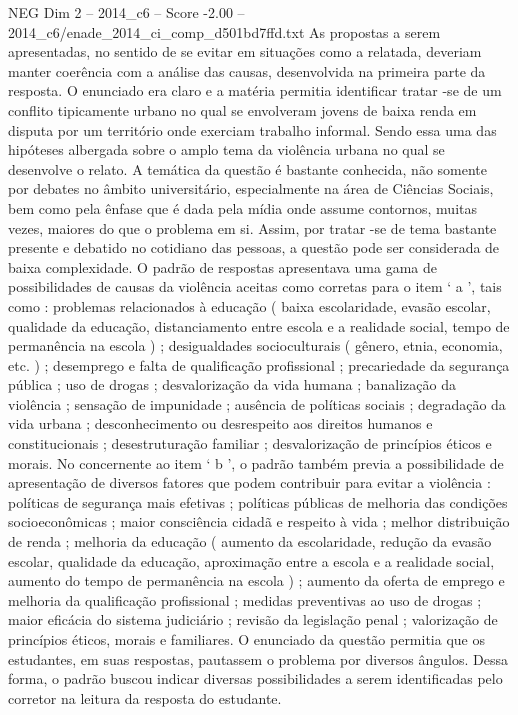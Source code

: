 \begin{textsample}{NEG Dim 2 – 2014\_c6 – Score -2.00 – 2014\_c6/enade\_2014\_ci\_comp\_d501bd7ffd.txt}
As propostas a serem apresentadas, no sentido de se evitar em situações como a relatada, deveriam manter coerência com a análise das causas, desenvolvida na primeira parte da resposta.
O enunciado era claro e a matéria permitia identificar tratar -se de um conflito tipicamente urbano no qual se envolveram jovens de baixa renda em disputa por um território onde exerciam trabalho informal.
Sendo essa uma das hipóteses albergada sobre o amplo tema da violência urbana no qual se desenvolve o relato.
A temática da questão é bastante conhecida, não somente por debates no âmbito universitário, especialmente na área de Ciências Sociais, bem como pela ênfase que é dada pela mídia onde assume contornos, muitas vezes, maiores do que o problema em si.
Assim, por tratar -se de tema bastante presente e debatido no cotidiano das pessoas, a questão pode ser considerada de baixa complexidade.
O padrão de respostas apresentava uma gama de possibilidades de causas da violência aceitas como corretas para o item ‘ a ’, tais como : problemas relacionados à educação ( baixa escolaridade, evasão escolar, qualidade da educação, distanciamento entre escola e a realidade social, tempo de permanência na escola ) ; desigualdades socioculturais ( gênero, etnia, economia, etc. ) ; desemprego e falta de qualificação profissional ; precariedade da segurança pública ; uso de drogas ; desvalorização da vida humana ; banalização da violência ; sensação de impunidade ; ausência de políticas sociais ; degradação da vida urbana ; desconhecimento ou desrespeito aos direitos humanos e constitucionais ; desestruturação familiar ; desvalorização de princípios éticos e morais.
No concernente ao item ‘ b ’, o padrão também previa a possibilidade de apresentação de diversos fatores que podem contribuir para evitar a violência : políticas de segurança mais efetivas ; políticas públicas de melhoria das condições socioeconômicas ; maior consciência cidadã e respeito à vida ; melhor distribuição de renda ; melhoria da educação ( aumento da escolaridade, redução da evasão escolar, qualidade da educação, aproximação entre a escola e a realidade social, aumento do tempo de permanência na escola ) ; aumento da oferta de emprego e melhoria da qualificação profissional ; medidas preventivas ao uso de drogas ; maior eficácia do sistema judiciário ; revisão da legislação penal ; valorização de princípios éticos, morais e familiares.
O enunciado da questão permitia que os estudantes, em suas respostas, pautassem o problema por diversos ângulos.
Dessa forma, o padrão buscou indicar diversas possibilidades a serem identificadas pelo corretor na leitura da resposta do estudante.

\end{textsample}
